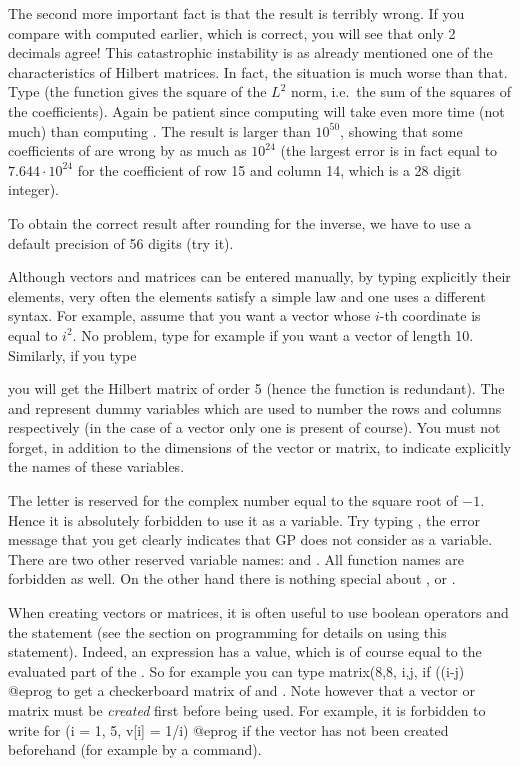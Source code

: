 The second more important fact is that the result is terribly wrong. If you
compare with  computed earlier, which is correct, you will see
that only 2 decimals agree! This catastrophic instability is as already
mentioned one of the characteristics of Hilbert matrices. In fact, the
situation is much worse than that. Type  (the
function  gives the square of the $L^2$ norm, i.e.~the sum of the
squares of the coefficients). Again be patient since computing  will
take even more time (not much) than computing . The result is
larger than $10^{50}$, showing that some coefficients of  are
wrong by as much as $10^{24}$ (the largest error is in fact equal to $7.644
\cdot 10^{24}$ for the coefficient of row 15 and column 14, which is a 28
digit integer).

To obtain the correct result after rounding for the inverse, we have to use a
default precision of 56 digits (try it).
\smallskip

Although vectors and matrices can be entered manually, by typing explicitly
their elements, very often the elements satisfy a simple law and one uses a
different syntax. For example, assume that you want a vector whose $i$-th
coordinate is equal to $i^2$. No problem, type for example
 if you want a vector of length 10. Similarly, if
you type

\centerline{}

\noindent you will get the Hilbert matrix of order 5 (hence the
 function is redundant).  The  and  represent
dummy variables which are used to number the rows and columns respectively
(in the case of a vector only one is present of course). You must not forget,
in addition to the dimensions of the vector or matrix, to indicate explicitly
the names of these variables.

 The letter  is reserved for the complex number
equal to the square root of $-1$. Hence it is absolutely forbidden to use
it as a variable. Try typing , the error message
that you get clearly indicates that GP does not consider  as a
variable. There are two other reserved variable names:  and
. All function names are forbidden as well. On the other hand
there is nothing special about ,  or .

When creating vectors or matrices, it is often useful to use boolean
operators and the  statement (see the section on programming for
details on using this statement). Indeed, an  expression has a value,
which is of course equal to the evaluated part of the . So for
example you can type
\bprog
matrix(8,8, i,j, if ((i-j)%
@eprog
\noindent to get a checkerboard matrix of  and . Note however
that a vector or matrix must be {\it created} first before being used. For
example, it is forbidden to write
\bprog
for (i = 1, 5, v[i] = 1/i)
@eprog
\noindent if the vector  has not been created beforehand (for example
by a  command).

